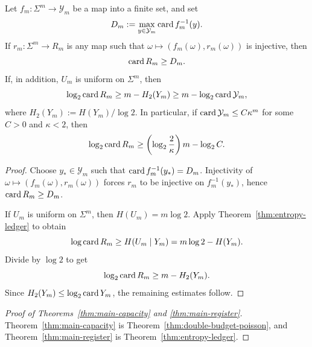 \begin{corollary}
\label{thm:register-lower-bound}
Let \(f_m:\Sigma^m\to \mathcal{Y}_m\) be a map into a finite set, and set
\[
  D_m:=\max_{y\in \mathcal{Y}_m}\operatorname{card}{f_m^{-1}(y)}.
\]
If \(r_m:\Sigma^m\to R_m\) is any map such that
\(\omega\mapsto(f_m(\omega),r_m(\omega))\) is injective, then
\[
  \operatorname{card}{R_m}\geq D_m.
\]
If, in addition, \(U_m\) is uniform on \(\Sigma^m\), then
\[
  \log_2\operatorname{card}{R_m}
  \geq m-H_2(Y_m)\geq m-\log_2\operatorname{card}{\mathcal{Y}_m},
\]
where \(H_2(Y_m):=H(Y_m)/\log 2\).  In particular, if
\(\operatorname{card}{\mathcal{Y}_m}\leq C\kappa^m\) for some \(C>0\) and \(\kappa<2\), then
\[
  \log_2\operatorname{card}{R_m}
  \geq \left(\log_2\frac{2}{\kappa}\right)m-\log_2 C.
\]
\end{corollary}

\begin{proof}
Choose \(y_\ast\in \mathcal{Y}_m\) such that
\(\operatorname{card}{f_m^{-1}(y_\ast)}=D_m\).  Injectivity of
\(\omega\mapsto(f_m(\omega),r_m(\omega))\) forces \(r_m\) to be
injective on \(f_m^{-1}(y_\ast)\), hence \(\operatorname{card}{R_m}\geq D_m\).

If \(U_m\) is uniform on \(\Sigma^m\), then \(H(U_m)=m\log 2\).  Apply
Theorem~\ref{thm:entropy-ledger} to obtain
\[
  \log\operatorname{card}{R_m}\geq H(U_m\mid Y_m)=m\log 2-H(Y_m).
\]
Divide by \(\log 2\) to get
\[
  \log_2\operatorname{card}{R_m}\geq m-H_2(Y_m).
\]
Since \(H_2(Y_m)\leq \log_2\operatorname{card}{Y_m}\), the remaining estimates follow.
\end{proof}

\begin{proof}[Proof of Theorems~\ref{thm:main-capacity} and \ref{thm:main-register}]
Theorem~\ref{thm:main-capacity} is
Theorem~\ref{thm:double-budget-poisson}, and
Theorem~\ref{thm:main-register} is
Theorem~\ref{thm:entropy-ledger}.
\end{proof}
